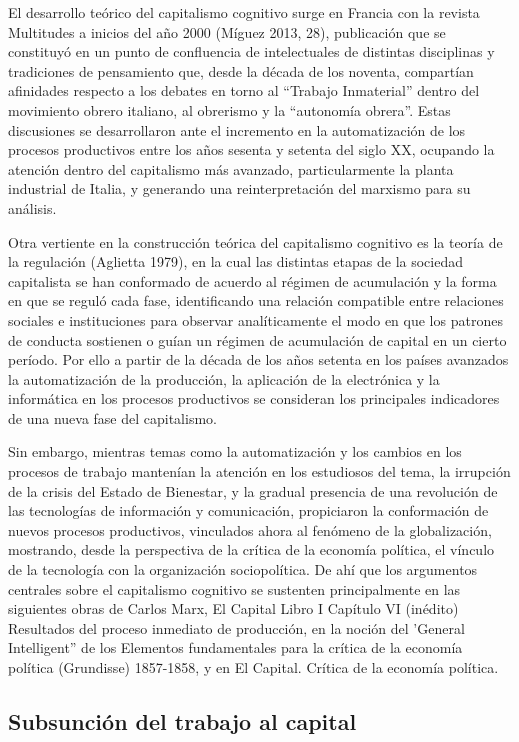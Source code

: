 \documentclass[
]{interact}
\begin{document}
El desarrollo teórico del capitalismo cognitivo surge en Francia con la
revista Multitudes a inicios del año 2000 (Míguez 2013, 28), publicación
que se constituyó en un punto de confluencia de intelectuales de
distintas disciplinas y tradiciones de pensamiento que, desde la década
de los noventa, compartían afinidades respecto a los debates en torno al
``Trabajo Inmaterial'' dentro del movimiento obrero italiano, al
obrerismo y la ``autonomía obrera''. Estas discusiones se desarrollaron
ante el incremento en la automatización de los procesos productivos
entre los años sesenta y setenta del siglo XX, ocupando la atención
dentro del capitalismo más avanzado, particularmente la planta
industrial de Italia, y generando una reinterpretación del marxismo para
su análisis.

Otra vertiente en la construcción teórica del capitalismo cognitivo es
la teoría de la regulación (Aglietta 1979), en la cual las distintas
etapas de la sociedad capitalista se han conformado de acuerdo al
régimen de acumulación y la forma en que se reguló cada fase,
identificando una relación compatible entre relaciones sociales e
instituciones para observar analíticamente el modo en que los patrones
de conducta sostienen o guían un régimen de acumulación de capital en un
cierto período. Por ello a partir de la década de los años setenta en
los países avanzados la automatización de la producción, la aplicación
de la electrónica y la informática en los procesos productivos se
consideran los principales indicadores de una nueva fase del
capitalismo.

Sin embargo, mientras temas como la automatización y los cambios en los
procesos de trabajo mantenían la atención en los estudiosos del tema, la
irrupción de la crisis del Estado de Bienestar, y la gradual presencia
de una revolución de las tecnologías de información y comunicación,
propiciaron la conformación de nuevos procesos productivos, vinculados
ahora al fenómeno de la globalización, mostrando, desde la perspectiva
de la crítica de la economía política, el vínculo de la tecnología con
la organización sociopolítica. De ahí que los argumentos centrales sobre
el capitalismo cognitivo se sustenten principalmente en las siguientes
obras de Carlos Marx, El Capital Libro I Capítulo VI (inédito)
Resultados del proceso inmediato de producción, en la noción del
'General Intelligent'' de los Elementos fundamentales para la crítica de
la economía política (Grundisse) 1857-1858, y en El Capital. Crítica de
la economía política.

\subsection{Subsunción del trabajo al
capital}\label{subsunciuxf3n-del-trabajo-al-capital}
\end{document}
